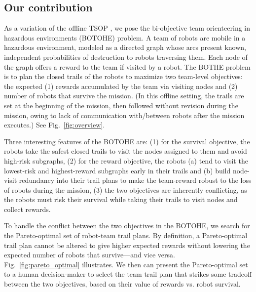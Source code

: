 \documentclass[11pt, oneside]{article}
\begin{document}
\subsection{Our contribution}
As a variation of the offline TSOP \cite{jorgensen2018team,jorgensen2017matroid,jorgensen2024matroid}, 
we pose the bi-objective team orienteering in hazardous environments (BOTOHE) problem. 
A team of robots are mobile in a hazardous environment, modeled as a directed graph whose arcs present known, independent probabilities of destruction to robots traversing them.
Each node of the graph offers a reward to the team if visited by a robot.
The BOTHE problem is to plan the closed trails of the robots to maximize two team-level objectives: the expected
(1) rewards accumulated by the team via visiting nodes and
(2) number of robots that survive the mission. 
(In this offline setting, the trails are set at the beginning of the mission, then followed without revision during the mission, owing to lack of communication with/between robots after the mission executes.)
See Fig.~\ref{fig:overview}.

Three interesting features of the BOTOHE are: 
(1) for the survival objective, the robots take the safest closed trails to visit the nodes assigned to them and avoid high-risk subgraphs,
(2) for the reward objective, the robots (a) tend to visit the lowest-risk and highest-reward subgraphs early in their trails and (b) build node-visit redundancy into their trail plans to make the team-reward robust to the loss of robots during the mission,
(3) the two objectives are inherently conflicting, as the robots must risk their survival while taking their trails to visit nodes and collect rewards.%

To handle the conflict between the two objectives in the BOTOHE, we search for the Pareto-optimal set \cite{pardalos2017non,branke2008multiobjective} of robot-team trail plans. By definition, a Pareto-optimal trail plan cannot be altered to give higher expected rewards without lowering the expected number of robots that survive---and vice versa. 
Fig.~\ref{fig:pareto_optimal} illustrates.
We then can present the Pareto-optimal set to a human decision-maker to select the team trail plan that strikes some tradeoff between the two objectives, based on their value of rewards vs. robot survival. 
\end{document}

